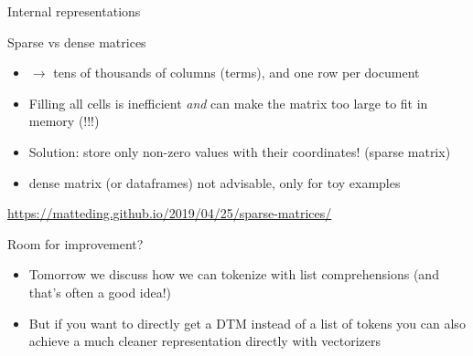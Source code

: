 \documentclass[compress]{beamer}
\begin{document}
\begin{frame}{Internal representations}
\begin{block}{Sparse vs dense matrices}
\begin{itemize}
	\item $\rightarrow$ tens of thousands of columns (terms), and one row per document
	\item Filling all cells is inefficient \emph{and} can make the matrix too large to fit in memory (!!!)
	\item Solution: store only non-zero values with their coordinates! (sparse matrix)
	\item dense matrix (or dataframes) not advisable, only for toy examples
\end{itemize}
\end{block}
\end{frame}


{
	\begin{frame}
\url{https://matteding.github.io/2019/04/25/sparse-matrices/}
\end{frame}
}


\begin{frame}{Room for improvement?}

\begin{itemize}
    	
    \item Tomorrow we discuss how we can tokenize with list comprehensions (and that's often a good idea!)
        \item But if you want to directly get a DTM instead of a list of tokens you can also achieve a much cleaner representation directly with vectorizers 
\end{itemize}
\end{frame}
\end{document}
